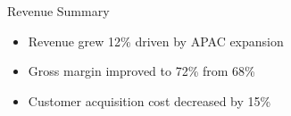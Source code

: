 \documentclass[palette=midnight]{rossbeamercorporate}
\begin{document}
\begin{frame}{Revenue Summary}
  \begin{itemize}
    \item Revenue grew 12\% driven by APAC expansion
    \item Gross margin improved to 72\% from 68\%
    \item Customer acquisition cost decreased by 15\%
  \end{itemize}
\end{frame}

\end{document}
